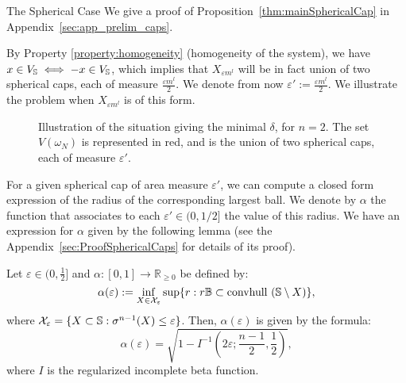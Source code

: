 \begin{subsection}{The Spherical Case}
We give a proof of Proposition~\ref{thm:mainSphericalCap} in Appendix~\ref{sec:app_prelim_caps}.

By Property \ref{property:homogeneity} (homogeneity of the system), we have $x \in V_{\mathbb{S}} \iff -x \in V_{\mathbb{S}}$,  which implies that $X_{\varepsilon m^l}$ will be in fact union of two spherical caps, each of measure $\frac{\varepsilon m^l}{2}$. We denote from now $\varepsilon':=\frac{\varepsilon m^l}{2}$. We illustrate the problem when $X_{\varepsilon m^l}$ is of this form.

\begin{figure}[H]
\begin{center}
\end{center}
\caption{Illustration of the situation giving the minimal $\delta$, for $n=2$. The set $V(\omega_N)$ is represented in red, and is the union of two spherical caps, each of measure $\varepsilon'$.}
\end{figure}


For a given spherical cap of area measure $\varepsilon'$, we can compute a closed form expression of the radius of the corresponding largest ball. We denote by $\alpha$ the function that associates to each $\varepsilon' \in (0,1/2]$ the value of this radius. We have an expression for $\alpha$ given by the following lemma (see the Appendix~\ref{sec:ProofSphericalCaps} for details of its proof).

\begin{lem}\label{lemma:propositionSphericalCaps}
Let $\varepsilon \in (0, \frac{1}{2}]$ and $\alpha: [0,1] \to \mathbb{R}_{\geq 0}$ be defined by:
\begin{equation}\label{eqn:ballinc}
\alpha(\varepsilon) := \inf_{X \in \mathcal{X}_{\varepsilon}} \sup\{r: r\mathbb{B} \subset \mbox{convhull }(\mathbb{S} \setminus X)\},
\end{equation}
where $\mathcal{X}_{\varepsilon} = \{ X \subset \mathbb{S}: \sigma^{n-1}(X) \leq \varepsilon \}$. Then, $\alpha(\varepsilon)$ is given by the formula:
\begin{equation}\label{eqn:alphaEpsilon}
\alpha(\varepsilon) = \sqrt{1- I^{-1} \left( 2\varepsilon; \frac{n-1}{2}, \frac{1}{2} \right)}, 
\end{equation}
where $I$ is the regularized incomplete beta function.
\end{lem}


\end{subsection}
